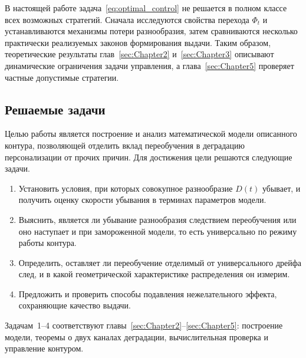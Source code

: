 В настоящей работе задача~\eqref{eq:optimal_control} не решается в полном классе
всех возможных стратегий. Сначала исследуются свойства перехода $\Phi_t$ и
устанавливаются механизмы потери разнообразия, затем сравниваются несколько
практически реализуемых законов формирования выдачи. Таким образом,
теоретические результаты глав~\ref{sec:Chapter2} и~\ref{sec:Chapter3} описывают
динамические ограничения задачи управления, а глава~\ref{sec:Chapter5}
проверяет частные допустимые стратегии.

\subsection{Решаемые задачи}
\label{subsec:questions}

Целью работы является построение и анализ математической модели описанного
контура, позволяющей отделить вклад переобучения в деградацию персонализации от
прочих причин. Для достижения цели решаются следующие задачи.
\begin{enumerate}
    \item Установить условия, при которых совокупное разнообразие $D(t)$ убывает,
    и получить оценку скорости убывания в терминах параметров модели.
    \item Выяснить, является ли убывание разнообразия следствием переобучения или
    оно наступает и при замороженной модели, то есть универсально по режиму
    работы контура.
    \item Определить, оставляет ли переобучение отделимый от универсального
    дрейфа след, и в какой геометрической характеристике распределения он
    измерим.
    \item Предложить и проверить способы подавления нежелательного эффекта,
    сохраняющие качество выдачи.
\end{enumerate}

Задачам~1--4 соответствуют главы~\ref{sec:Chapter2}--\ref{sec:Chapter5}:
построение модели, теоремы о двух каналах деградации, вычислительная проверка и
управление контуром.
